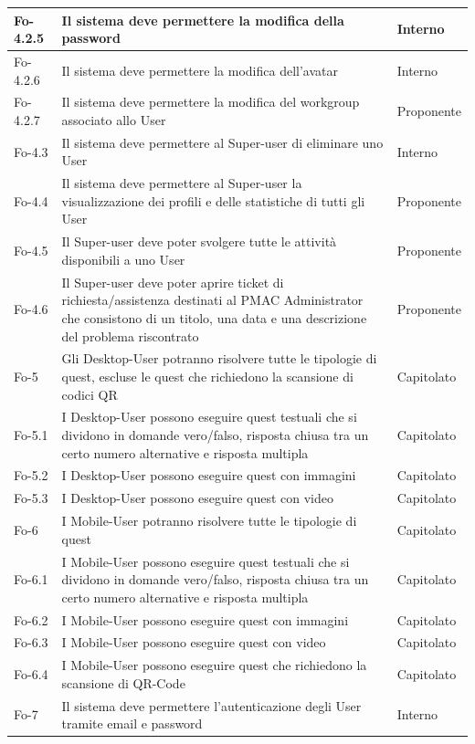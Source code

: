 {{\begin{longtable}{|p{}|p{}|p{}|}
\hline
Fo-4.2.5 & Il sistema deve permettere la modifica della password & Interno\\
\hline
Fo-4.2.6 & Il sistema deve permettere la modifica dell'avatar & Interno\\
\hline
Fo-4.2.7 & Il sistema deve permettere la modifica del workgroup associato allo User & Proponente\\
\hline
Fo-4.3 & Il sistema deve permettere al Super-user di eliminare uno User & Interno\\
\hline
Fo-4.4 & Il sistema deve permettere al Super-user la visualizzazione dei profili e delle statistiche di tutti gli User & Proponente\\
\hline
Fo-4.5 & Il Super-user deve poter svolgere tutte le attività disponibili a uno User & Proponente\\
\hline
Fo-4.6 & Il Super-user deve poter aprire ticket di richiesta/assistenza destinati al PMAC Administrator che consistono di un titolo, una data e una descrizione del problema riscontrato & Proponente\\
\hline
Fo-5 & Gli Desktop-User potranno risolvere tutte le tipologie di quest, escluse le quest che richiedono la scansione di codici QR & Capitolato\\
\hline
Fo-5.1 & I Desktop-User possono eseguire quest testuali che si dividono in domande vero/falso, risposta chiusa tra un certo numero alternative e risposta multipla & Capitolato\\
\hline
Fo-5.2 & I Desktop-User possono eseguire quest con immagini & Capitolato\\
\hline
Fo-5.3 & I Desktop-User possono eseguire quest con video & Capitolato\\
\hline
Fo-6 & I Mobile-User potranno risolvere tutte le tipologie di quest & Capitolato\\
\hline
Fo-6.1 & I Mobile-User possono eseguire quest testuali che si dividono in domande vero/falso, risposta chiusa tra un certo numero alternative e risposta multipla & Capitolato\\
\hline
Fo-6.2 & I Mobile-User possono eseguire quest con immagini & Capitolato\\
\hline
Fo-6.3 & I Mobile-User possono eseguire quest con video & Capitolato\\
\hline
Fo-6.4 & I Mobile-User possono eseguire quest che richiedono la  scansione di QR-Code & Capitolato\\
\hline
Fo-7 & Il sistema deve permettere l'autenticazione degli User tramite email e password & Interno\\

\end{longtable}}}
